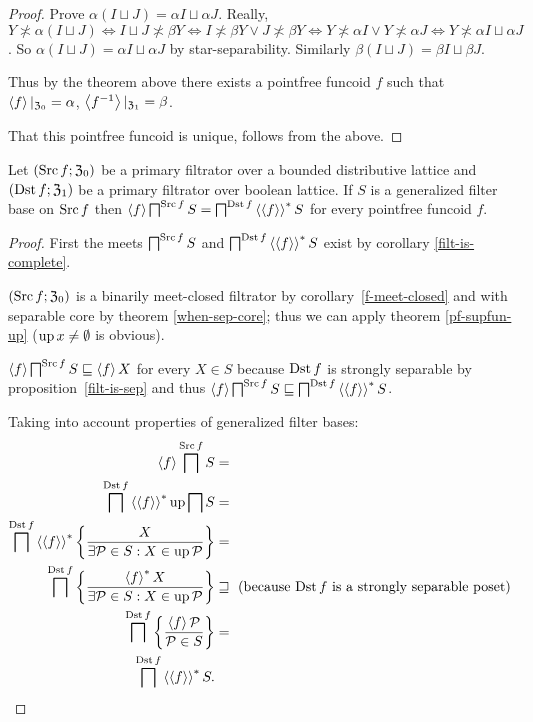 \begin{proof}
Prove $\alpha(I\sqcup J)=\alpha I\sqcup\alpha J$. Really, $Y\nasymp\alpha(I\sqcup J)\Leftrightarrow I\sqcup J\nasymp\beta Y\Leftrightarrow I\nasymp\beta Y\vee J\nasymp\beta Y\Leftrightarrow Y\nasymp\alpha I\vee Y\nasymp\alpha J\Leftrightarrow Y\nasymp\alpha I\sqcup\alpha J$.
So $\alpha(I\sqcup J)=\alpha I\sqcup\alpha J$ by star-separability.
Similarly $\beta(I\sqcup J)=\beta I\sqcup\beta J$.

Thus by the theorem above there exists a pointfree funcoid $f$ such that
$\left\langle f\right\rangle|_{\mathfrak{Z}_0}=\alpha$, $\left\langle f^{-1}\right\rangle|_{\mathfrak{Z}_1}=\beta$.

That this pointfree funcoid is unique, follows from the above.\end{proof}
\begin{prop}
Let $(\operatorname{Src} f;\mathfrak{Z}_{0})$ be a primary filtrator over a bounded
distributive lattice and $(\operatorname{Dst} f;\mathfrak{Z}_{1})$ be a primary
filtrator over boolean lattice. If $S$ is a generalized filter base
on $\operatorname{Src} f$ then $\left\langle f\right\rangle\bigsqcap^{\operatorname{Src} f}S=\bigsqcap^{\operatorname{Dst} f}\left\langle \left\langle f\right\rangle\right\rangle ^{\ast}S$
for every pointfree funcoid $f$.\end{prop}
\begin{proof}
First the meets $\bigsqcap^{\operatorname{Src} f}S$ and $\bigsqcap^{\operatorname{Dst} f}\left\langle \left\langle f\right\rangle\right\rangle ^{\ast}S$
exist by corollary \ref{filt-is-complete}.

$(\operatorname{Src} f;\mathfrak{Z}_{0})$ is a binarily meet-closed filtrator by
corollary~\ref{f-meet-closed} and with separable core by theorem
\ref{when-sep-core}; thus we can apply theorem \ref{pf-supfun-up}
($\operatorname{up} x\neq\emptyset$ is obvious).

$\left\langle f\right\rangle\bigsqcap^{\operatorname{Src} f}S\sqsubseteq\left\langle f\right\rangle X$ for every $X\in S$
because $\operatorname{Dst} f$ is strongly separable by proposition~\ref{filt-is-sep} and thus
$\left\langle f\right\rangle\bigsqcap^{\operatorname{Src} f}S\sqsubseteq\bigsqcap^{\operatorname{Dst} f}\left\langle \left\langle f\right\rangle\right\rangle ^{\ast}S$.

Taking into account properties of generalized filter bases:
\begin{align*}
\left\langle f\right\rangle\bigsqcap^{\operatorname{Src} f}S & =\\
\bigsqcap^{\operatorname{Dst} f}\left\langle \left\langle f\right\rangle\right\rangle ^{\ast}\operatorname{up}\bigsqcap S & =\\
\bigsqcap^{\operatorname{Dst} f}\left\langle \left\langle f\right\rangle\right\rangle ^{\ast}\left\{ \frac{X}{\exists\mathcal{P}\in S:X\in\operatorname{up}\mathcal{P}}\right\} & =\\
\bigsqcap^{\operatorname{Dst} f}\left\{ \frac{\left\langle f\right\rangle ^{\ast}X}{\exists\mathcal{P}\in S:X\in\operatorname{up}\mathcal{P}}\right\} & \sqsupseteq\text{ (because \ensuremath{\operatorname{Dst} f} is a strongly separable poset)}\\
\bigsqcap^{\operatorname{Dst} f}\left\{ \frac{\left\langle f\right\rangle\mathcal{P}}{\mathcal{P}\in S}\right\} & =\\
\bigsqcap^{\operatorname{Dst} f}\left\langle \left\langle f\right\rangle\right\rangle ^{\ast}S.
\end{align*}
\end{proof}
